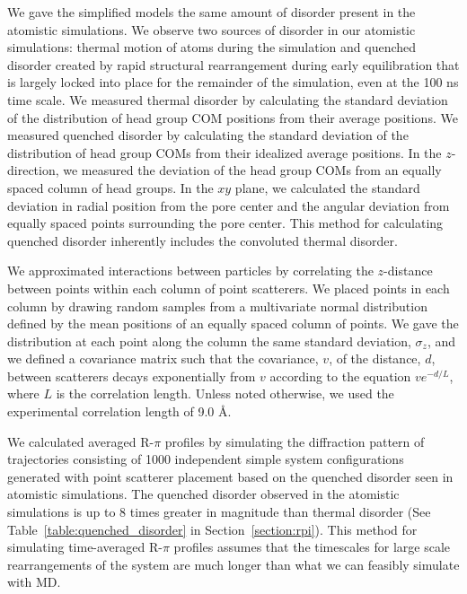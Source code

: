   We gave the simplified models the same amount of disorder present in the
  atomistic simulations. We observe two sources of disorder in our atomistic
  simulations: thermal motion of atoms during the simulation and quenched
  disorder created by rapid structural rearrangement during early equilibration
  that is largely locked into place for the remainder of the simulation, even at
  the 100 ns time scale. We measured thermal disorder by calculating the standard
  deviation of the distribution of head group COM positions from their average
  positions. We measured quenched disorder by calculating the standard deviation
  of the distribution of head group COMs from their idealized average positions.
  In the $z$-direction, we measured the deviation of the head group COMs from an
  equally spaced column of head groups. In the $xy$ plane, we calculated the
  standard deviation in radial position from the pore center and the angular
  deviation from equally spaced points surrounding the pore center. This method
  for calculating quenched disorder inherently includes the convoluted thermal
  disorder. 
  
  We approximated interactions between particles by correlating the $z$-distance 
  between points within each column of point scatterers. We placed points in each
  column by drawing random samples from a multivariate normal distribution defined
  by the mean positions of an equally spaced column of points. We gave the 
  distribution at each point along the column the same standard deviation, 
  $\sigma_z$, and we defined a covariance matrix such that the covariance, $v$, of
  the distance, $d$, between scatterers decays exponentially from $v$ according
  to the equation $ve^{-d/L}$, where $L$ is the correlation length. Unless noted
  otherwise, we used the experimental correlation length of 9.0 \AA. 
  
  We calculated averaged R-$\pi$ profiles by simulating the diffraction pattern
  of trajectories consisting of 1000 independent simple system configurations 
  generated with point scatterer placement based on the quenched disorder seen in
  atomistic simulations. The quenched disorder observed in the atomistic simulations
  is up to 8 times greater in magnitude than thermal disorder (See Table~\ref{table:quenched_disorder}
  in Section~\ref{section:rpi}). This method for simulating time-averaged R-$\pi$ profiles
  assumes that the timescales for large scale rearrangements of the
  system are much longer than what we can feasibly simulate with MD.

